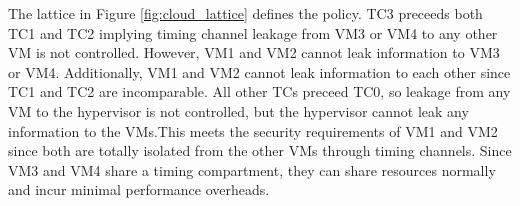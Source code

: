     The lattice in Figure \ref{fig:cloud_lattice} defines the policy. TC3 
    preceeds both TC1 and TC2 implying timing channel leakage from VM3 or VM4 
    to any other VM is not controlled. However, VM1 and VM2 cannot leak 
    information to VM3 or VM4. Additionally, VM1 and VM2 cannot leak 
    information to each other since TC1 and TC2 are incomparable. All other TCs 
    preceed TC0, so leakage from any VM to the hypervisor is not controlled, 
    but the hypervisor cannot leak any information to the VMs.This meets the 
    security requirements of VM1 and VM2 since both are totally isolated from 
    the other VMs through timing channels. Since VM3 and VM4 share a timing 
    compartment, they can share resources normally and incur minimal 
    performance overheads.
